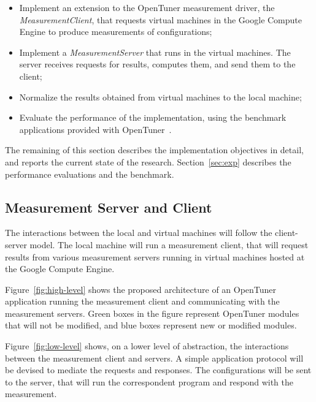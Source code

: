 \documentclass[a4paper, 12pt]{article}
\begin{document}
\begin{itemize}
    \item Implement an extension to the OpenTuner measurement driver,
        the \emph{MeasurementClient}, that requests virtual
        machines in the Google Compute Engine to produce
        measurements of configurations;
    \item Implement a \emph{MeasurementServer} that runs
        in the virtual machines. The server receives
        requests for results, computes them, and send
        them to the client;
    \item Normalize the results obtained from virtual machines
        to the local machine;
    \item Evaluate the performance of the implementation,
        using the benchmark applications provided with
        OpenTuner~\cite{ansel2014opentuner}.
\end{itemize}

The remaining of this section describes the implementation objectives in
detail, and reports the current state of the research. Section~\ref{sec:exp}
describes the performance evaluations and the benchmark.

\subsection{Measurement Server and Client}

The interactions between the local and virtual machines
will follow the client-server model. The local machine
will run a measurement client, that will request
results from various measurement servers running in
virtual machines hosted at the Google Compute Engine.

Figure~\ref{fig:high-level} shows the proposed architecture
of an OpenTuner application running the measurement
client and communicating with the measurement servers.
Green boxes in the figure represent OpenTuner modules
that will not be modified, and blue boxes represent
new or modified modules.

Figure~\ref{fig:low-level} shows, on a lower level
of abstraction, the interactions between the measurement
client and servers. A simple application protocol
will be devised to mediate the requests and responses.
The configurations will be sent to the server, that
will run the correspondent program and respond with
the measurement.
\end{document}
